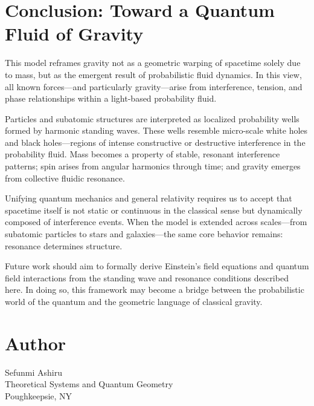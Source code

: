 \documentclass[12pt]{article}
\begin{document}
\section{Conclusion: Toward a Quantum Fluid of Gravity}
This model reframes gravity not as a geometric warping of spacetime solely due to mass, but as the emergent result of probabilistic fluid dynamics. In this view, all known forces---and particularly gravity---arise from interference, tension, and phase relationships within a light-based probability fluid.

Particles and subatomic structures are interpreted as localized probability wells formed by harmonic standing waves. These wells resemble micro-scale white holes and black holes---regions of intense constructive or destructive interference in the probability fluid. Mass becomes a property of stable, resonant interference patterns; spin arises from angular harmonics through time; and gravity emerges from collective fluidic resonance.

Unifying quantum mechanics and general relativity requires us to accept that spacetime itself is not static or continuous in the classical sense but dynamically composed of interference events. When the model is extended across scales---from subatomic particles to stars and galaxies---the same core behavior remains: resonance determines structure.

Future work should aim to formally derive Einstein's field equations and quantum field interactions from the standing wave and resonance conditions described here. In doing so, this framework may become a bridge between the probabilistic world of the quantum and the geometric language of classical gravity.

\section*{Author}
Sefunmi Ashiru\\Theoretical Systems and Quantum Geometry\\Poughkeepsie, NY
\end{document}
